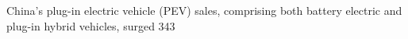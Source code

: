 China's plug-in electric vehicle (PEV) sales, comprising both battery electric and plug-in hybrid vehicles, surged 343%